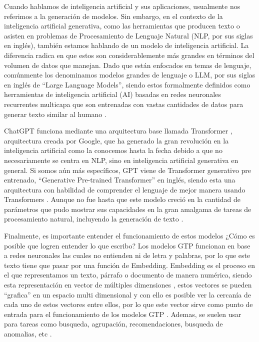 
\par Cuando hablamos de inteligencia artificial y sus aplicaciones, usualmente nos referimos a la generación de modelos. Sin embargo,
en el contexto de la inteligencia artificial generativa, como las herramientas que producen texto o asisten en problemas de 
Procesamiento de Lenguaje Natural (NLP, por sus siglas en inglés), también estamos hablando de un modelo de inteligencia 
artificial. La diferencia radica en que estos son considerablemente más grandes en términos del volumen de datos que manejan. 
Dado que están enfocados en temas de lenguaje, comúnmente los denominamos modelos grandes de lenguaje o LLM, por sus siglas 
en inglés de ``Large Language Models'', siendo estos formalmente definidos como herramientas de inteligencia artificial (AI) 
basadas en redes neuronales recurrentes multicapa que son entrenadas con vastas cantidades de datos para generar texto 
similar al humano \cite{mt6}.


\par ChatGPT funciona mediante una arquitectura base llamada Transformer \cite{aiayn}, arquitectura creada por Google, que ha generado 
la gran revolución en la inteligencia artificial como la conocemos hasta la fecha debido a que no necesariamente se centra en NLP, 
sino en inteligencia artificial generativa en general. Si somos aún más específicos, GPT viene de Transformer generativo 
pre entrenado, ``Generative Pre-trained Transformer'' en inglés, siendo esta una arquitectura con habilidad de comprender el 
lenguaje de mejor manera usando Transformers \cite{mt4}. Aunque no fue hasta que este modelo creció en la cantidad de parámetros que 
pudo mostrar sus capacidades en la gran amalgama de tareas de procesamiento natural, incluyendo la generación de texto \cite{mt5}.


Finalmente, es importante entender el funcionamiento de estos modelos ¿Cómo es posible que logren entender lo que escribo? Los modelos 
GTP funcionan en base a redes neuronales las cuales no entienden ni de letra y palabras, por lo que este texto tiene que pasar por
una función de Embedding. Embedding es el proceso en el que representamos un texto, párrafo o documento de manera numérica, siendo
esta representación en vector de múltiples dimensiones \cite{eb1}, estos vectores se pueden ``grafica'' en un espacio multi dimensional y con 
ello es posible ver la cercanía de cada uno de estos vectores entre ellos, por lo que este vector sirve como punto de entrada para
el funcionamiento de los modelos GTP \cite{eb2}. Ademas, se suelen usar para tareas como busqueda, agrupación, recomendaciones, 
busqueda de anomalias, etc \cite{eb3}.


